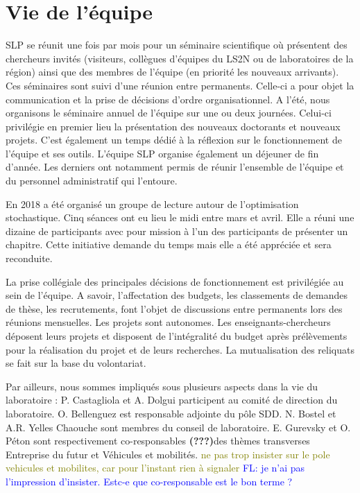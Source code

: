 \section{Vie de l'équipe}\label{slp:vieequipe}

SLP se réunit une fois par mois pour un séminaire scientifique où présentent des chercheurs invités (visiteurs, collègues d'équipes du LS2N ou de laboratoires de la région) ainsi que des membres de l'équipe (en priorité les nouveaux arrivants). 
Ces séminaires sont suivi d'une réunion entre permanents. Celle-ci a pour objet la communication et la prise de décisions d'ordre organisationnel. 
A l'été, nous organisons le séminaire annuel de l'équipe sur une ou deux journées.
Celui-ci  privilégie en premier lieu la présentation des nouveaux doctorants et nouveaux projets. C'est également un temps dédié à la réflexion sur le fonctionnement de l'équipe et ses outils.
L'équipe SLP organise également un déjeuner de fin d'année. Les derniers ont notamment permis de réunir l'ensemble de l'équipe et du personnel administratif qui l'entoure.

En 2018 a été organisé un groupe de lecture autour de l'optimisation stochastique. Cinq séances ont eu lieu le midi entre mars et avril. Elle a réuni une dizaine de participants avec pour mission à l'un des participants de présenter un chapitre. Cette initiative demande du temps mais elle a été appréciée et sera reconduite.

La prise collégiale des principales décisions de fonctionnement est privilégiée au sein de l'équipe. A savoir, l'affectation des budgets, les classements de demandes de thèse, les recrutements, font l'objet de discussions entre permanents lors des réunions mensuelles. 
Les projets sont autonomes. Les enseignants-chercheurs déposent leurs projets et disposent de l'intégralité du budget après prélèvements pour la réalisation du projet et de leurs recherches. La mutualisation des reliquats se fait sur la base du volontariat.

Par ailleurs, nous sommes impliqués sous plusieurs aspects dans la vie du laboratoire :
P. Castagliola et A. Dolgui participent au comité de direction du laboratoire. 
O. Bellenguez est responsable adjointe du pôle SDD. 
N. Bostel et A.R. Yelles Chaouche sont membres du conseil de laboratoire. 
E. Gurevsky et O. Péton sont respectivement co-responsables \textbf{(???)}des thèmes transverses Entreprise du futur et Véhicules et mobilités. \textcolor{olive}{ne pas trop insister sur le pole vehicules et mobilites, car pour l'instant rien à signaler} \textcolor{blue}{FL: je n'ai pas l'impression d'insister. Estc-e que co-responsable est le bon terme ?}

